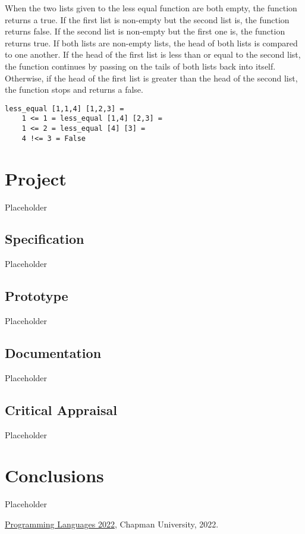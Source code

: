 \documentclass{article}
\theoremstyle{theorem}
\theoremstyle{definition}
\theoremstyle{remark}
\begin{document}
\medskip\noindent
When the two lists given to the less equal function are both empty, the function returns a true. If the first list is non-empty but the second list is, the function returns false. If the second list is non-empty but the first one is, the function returns true. If both lists are non-empty lists, the head of both lists is compared to one another. If the head of the first list is less than or equal to the second list, the function continues by passing on the tails of both lists back into itself. Otherwise, if the head of the first list is greater than the head of the second list, the function stops and returns a false.

\begin{lstlisting}
less_equal [1,1,4] [1,2,3] =
	1 <= 1 = less_equal [1,4] [2,3] =
	1 <= 2 = less_equal [4] [3] =
	4 !<= 3 = False
\end{lstlisting}

\section{Project}

Placeholder

\subsection{Specification}

Placeholder

\subsection{Prototype}

Placeholder

\subsection{Documentation}

Placeholder

\subsection{Critical Appraisal}

Placeholder

\section{Conclusions}\label{conclusions}

Placeholder

\begin{thebibliography}{99}
 \href{https://github.com/alexhkurz/programming-languages-2022/blob/main/README.md}{Programming Languages 2022}, Chapman University, 2022.
\end{thebibliography}
\end{document}
